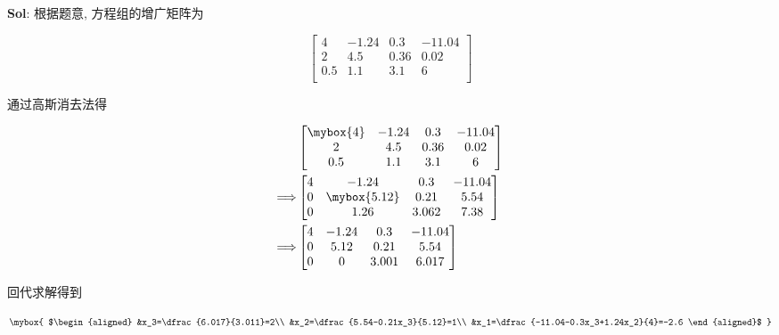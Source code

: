\textbf{Sol}: 根据题意, 方程组的增广矩阵为

$$
\begin{bmatrix}
    4&-1.24&0.3&-11.04\\
    2&4.5&0.36&0.02\\
    0.5&1.1&3.1&6\\
\end{bmatrix}
$$

通过高斯消去法得

$$
\begin{aligned}
    &\begin{bmatrix}
        \mybox{4}&-1.24&0.3&-11.04\\
        2&4.5&0.36&0.02\\
        0.5&1.1&3.1&6\\
    \end{bmatrix}\\
    \Longrightarrow&
    \begin{bmatrix}
        4&-1.24&0.3&-11.04\\
        0&\mybox{5.12}&0.21&5.54\\
        0&1.26&3.062&7.38\\
    \end{bmatrix}\\
    \Longrightarrow&
    \begin{bmatrix}
        4&-1.24&0.3&-11.04\\
        0&5.12&0.21&5.54\\
        0&0&3.001&6.017
    \end{bmatrix}
\end{aligned}
$$

回代求解得到

$$
\mybox{
$\begin{aligned}
    &x_3=\dfrac{6.017}{3.011}=2\\
    &x_2=\dfrac{5.54-0.21x_3}{5.12}=1\\
    &x_1=\dfrac{-11.04-0.3x_3+1.24x_2}{4}=-2.6
\end{aligned}$
}
$$

\vspace{12pt}


